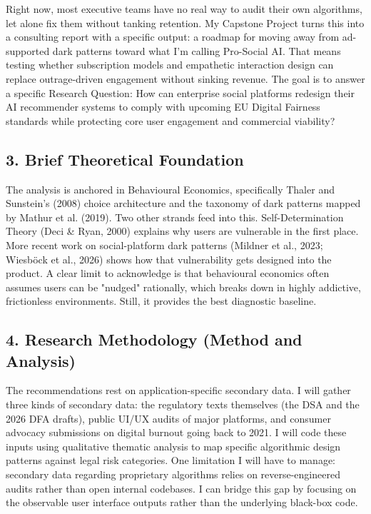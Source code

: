 \documentclass[11pt]{article}
\begin{document}
Right now, most executive teams have no real way to audit their own algorithms, let alone fix them without tanking retention. My Capstone Project turns this into a consulting report with a specific output: a roadmap for moving away from ad-supported dark patterns toward what I'm calling Pro-Social AI. That means testing whether subscription models and empathetic interaction design can replace outrage-driven engagement without sinking revenue. The goal is to answer a specific Research Question: How can enterprise social platforms redesign their AI recommender systems to comply with upcoming EU Digital Fairness standards while protecting core user engagement and commercial viability?

\subsection*{3. Brief Theoretical Foundation}
The analysis is anchored in Behavioural Economics, specifically Thaler and Sunstein's (2008) choice architecture and the taxonomy of dark patterns mapped by Mathur et al. (2019). Two other strands feed into this. Self-Determination Theory (Deci \& Ryan, 2000) explains why users are vulnerable in the first place. More recent work on social-platform dark patterns (Mildner et al., 2023; Wiesb\"ock et al., 2026) shows how that vulnerability gets designed into the product. A clear limit to acknowledge is that behavioural economics often assumes users can be "nudged" rationally, which breaks down in highly addictive, frictionless environments. Still, it provides the best diagnostic baseline.

\subsection*{4. Research Methodology (Method and Analysis)}
The recommendations rest on application-specific secondary data. I will gather three kinds of secondary data: the regulatory texts themselves (the DSA and the 2026 DFA drafts), public UI/UX audits of major platforms, and consumer advocacy submissions on digital burnout going back to 2021. I will code these inputs using qualitative thematic analysis to map specific algorithmic design patterns against legal risk categories. One limitation I will have to manage: secondary data regarding proprietary algorithms relies on reverse-engineered audits rather than open internal codebases. I can bridge this gap by focusing on the observable user interface outputs rather than the underlying black-box code.
\end{document}
